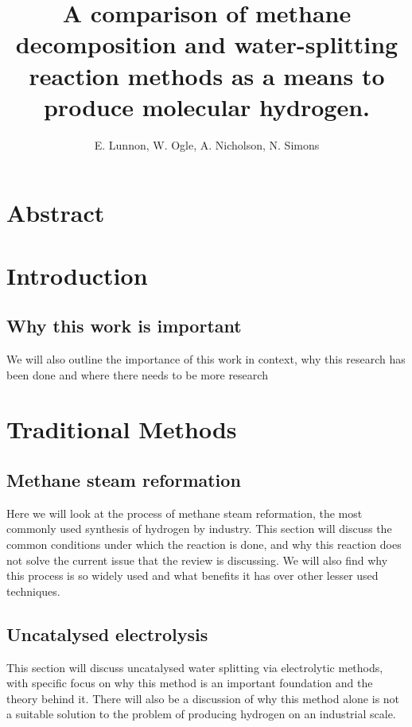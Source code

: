 \documentclass[a4paper]{article}
\title{A comparison of methane decomposition and water-splitting reaction methods as a means to produce molecular hydrogen.}
\author{E. Lunnon, W. Ogle, A. Nicholson, N. Simons}
\begin{document}
\maketitle
\tableofcontents
\newpage


\section*{Abstract}%
\label{sec:abstract}


\section{Introduction}%
\label{sec:introduction}

\subsection{Why this work is important}%
\label{sub:why_this_work_is_important}
We will also outline the importance of this work in context, why this research has been done and where there needs to be more research


\section{Traditional Methods}%
\label{sub:Traditional_Methods}

\subsection{Methane steam reformation}%
\label{sub:Steam_reformation}

Here we will look at the process of methane steam reformation, the most commonly used synthesis of hydrogen by industry.
This section will discuss the common conditions under which the reaction is done, and why this reaction does not solve the current issue that the review is discussing.
We will also find why this process is so widely used and what benefits it has over other lesser used techniques.

\subsection{Uncatalysed electrolysis}%
\label{sub:Uncatalysed_electrolysis}

This section will discuss uncatalysed water splitting via electrolytic methods, with specific focus on why this method is an important foundation and the theory behind it.
There will also be a discussion of why this method alone is not a suitable solution to the problem of producing hydrogen on an industrial scale.
\end{document}
